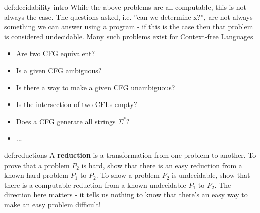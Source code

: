 \documentclass[landscape, 8pt]{extarticle}
\begin{document}
\begin{multicols}{3}
\begin{dfn}{def:decidability-intro}{}
While the above problems are all computable, this is not always the case. The
questions asked, i.e. ”can we determine x?”, are not always something we can
answer using a program - if this is the case then that problem is considered
undecidable.\newline
Many such problems exist for Context-free Languages
\renewcommand\labelitemi{\tiny$\bullet$}
\begin{itemize}
    \setlength\itemsep{0em}
    \item Are two CFG equivalent?
    \item Is a given CFG ambiguous?
    \item Is there a way to make a given CFG unambiguous?
    \item Is the intersection of two CFLs empty?
    \item Does a CFG generate all strings $\Sigma^{*}$?
    \item ...
\end{itemize}
\end{dfn}



\begin{dfn}[Reductions]{def:reductions}{}
A \textbf{reduction} is a transformation from one problem to another. To prove that a problem $P_{2}$ is hard, show that there is an easy reduction from a known hard problem $P_{1}$ to $P_{2}$.\newline
To show a problem $P_{2}$ is undecidable, show that there is a computable reduction from a known undecidable $P_{1}$ to $P_{2}$. The direction here matters - it tells us nothing to know that there's an easy way to make an easy problem difficult!
\end{dfn}

\vspace*{-5pt}


\end{multicols}
\end{document}
